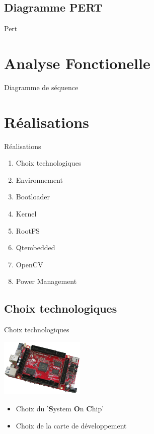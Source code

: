 \documentclass[11pt]{beamer}
\begin{document}
	\subsection{Diagramme PERT}
	\begin{frame}{Pert}
		\begin{center}
			
		\end{center}
	\end{frame}
	
	\section{Analyse Fonctionelle}
	\begin{frame}{Diagramme de séquence}
	
	\end{frame}
	
	\section{Réalisations}
	
	\begin{frame}{Réalisations}
		
		\begin{enumerate}
			\item<+-|alert@+> Choix technologiques
			\item<+-|alert@+> Environnement
			\item<+-|alert@+> Bootloader
			\item<+-|alert@+> Kernel
			\item<+-|alert@+> RootFS
			\item<+-|alert@+> Qtembedded
			\item<+-|alert@+> OpenCV
			\item<+-|alert@+> Power Management
		\end{enumerate}
		
	\end{frame}
	
	\subsection{Choix technologiques}
	\begin{frame}{Choix technologiques}
	\begin{center}
		  \includegraphics[width=4cm]{commons/A20-OLinuXino-MICRO-0.jpg}
		 \begin{itemize}
			\item Choix du '\textbf<2>{S}ystem \textbf<2>{O}n \textbf<2>{C}hip'
			\item Choix de la carte de développement
		\end{itemize}
	\end{center}
	\end{frame}
	
\end{document}
